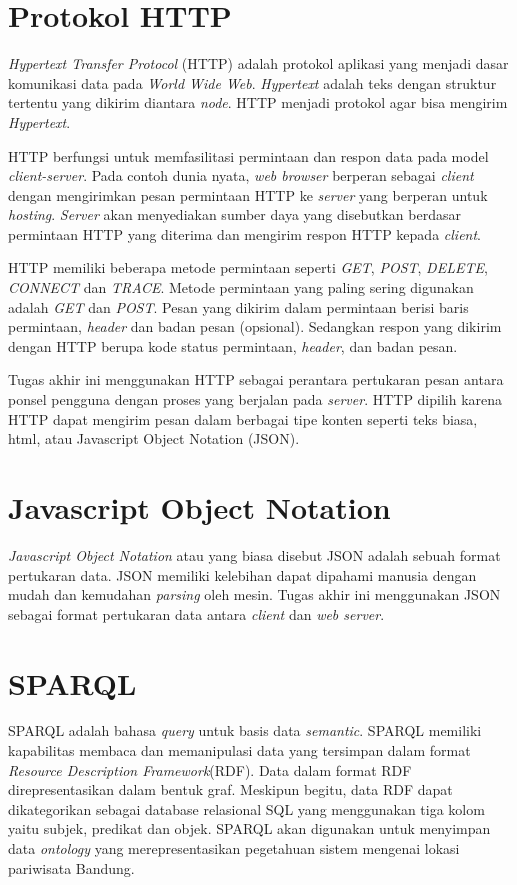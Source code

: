 \section{Protokol HTTP}
\textit{Hypertext Transfer Protocol} (HTTP) adalah protokol aplikasi yang menjadi dasar komunikasi data pada \textit{World Wide Web}. \textit{Hypertext} adalah teks dengan struktur tertentu yang dikirim diantara \textit{node}. HTTP menjadi protokol agar bisa mengirim \textit{Hypertext}.
\par
HTTP berfungsi untuk memfasilitasi permintaan dan respon data pada model \textit{client-server}. Pada contoh dunia nyata, \textit{web browser} berperan sebagai \textit{client} dengan mengirimkan pesan permintaan HTTP ke \textit{server} yang berperan untuk \textit{hosting}. \textit{Server} akan menyediakan sumber daya yang disebutkan berdasar permintaan HTTP yang diterima dan mengirim respon HTTP kepada \textit{client}.
\par
HTTP memiliki beberapa metode permintaan seperti \textit{GET}, \textit{POST}, \textit{DELETE}, \textit{CONNECT} dan \textit{TRACE}. Metode permintaan yang paling sering digunakan adalah \textit{GET} dan \textit{POST}. Pesan yang dikirim dalam permintaan berisi baris permintaan, \textit{header} dan badan pesan (opsional). Sedangkan respon yang dikirim dengan HTTP berupa kode status permintaan, \textit{header}, dan badan pesan.
\par
Tugas akhir ini menggunakan HTTP sebagai perantara pertukaran pesan antara ponsel pengguna dengan proses yang berjalan pada \textit{server}. HTTP dipilih karena HTTP dapat mengirim pesan dalam berbagai tipe konten seperti teks biasa, html, atau Javascript Object Notation (JSON).   

\section{Javascript Object Notation}
\textit{Javascript Object Notation} atau yang biasa disebut JSON adalah sebuah format pertukaran data. JSON memiliki kelebihan dapat dipahami manusia dengan mudah dan kemudahan \textit{parsing} oleh mesin. 
\newline
Tugas akhir ini menggunakan JSON sebagai format pertukaran data antara \textit{client} dan \textit{web server}.

\section{SPARQL}
SPARQL adalah bahasa \textit{query} untuk basis data \textit{semantic}. SPARQL memiliki kapabilitas membaca dan memanipulasi data yang tersimpan dalam format \textit{Resource Description Framework}(RDF). Data dalam format RDF direpresentasikan dalam bentuk graf. Meskipun begitu, data RDF dapat dikategorikan sebagai database relasional SQL yang menggunakan tiga kolom yaitu subjek, predikat dan objek.
SPARQL akan digunakan untuk menyimpan data \textit{ontology} yang merepresentasikan pegetahuan sistem mengenai lokasi pariwisata Bandung. 
 